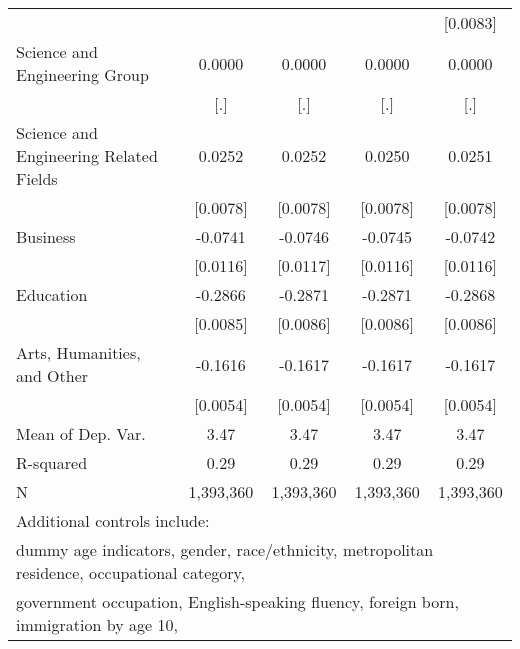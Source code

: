\begin{table}[htbp]
\begin{tabular}{l*{4}{c}}
                    &                     &                     &                     &    [0.0083]         \\
\addlinespace
Science and Engineering Group&      0.0000         &      0.0000         &      0.0000         &      0.0000         \\
                    &         [.]         &         [.]         &         [.]         &         [.]         \\
\addlinespace
Science and Engineering Related Fields&      0.0252\sym{***}&      0.0252\sym{***}&      0.0250\sym{***}&      0.0251\sym{***}\\
                    &    [0.0078]         &    [0.0078]         &    [0.0078]         &    [0.0078]         \\
\addlinespace
Business            &     -0.0741\sym{***}&     -0.0746\sym{***}&     -0.0745\sym{***}&     -0.0742\sym{***}\\
                    &    [0.0116]         &    [0.0117]         &    [0.0116]         &    [0.0116]         \\
\addlinespace
Education           &     -0.2866\sym{***}&     -0.2871\sym{***}&     -0.2871\sym{***}&     -0.2868\sym{***}\\
                    &    [0.0085]         &    [0.0086]         &    [0.0086]         &    [0.0086]         \\
\addlinespace
Arts, Humanities, and Other&     -0.1616\sym{***}&     -0.1617\sym{***}&     -0.1617\sym{***}&     -0.1617\sym{***}\\
                    &    [0.0054]         &    [0.0054]         &    [0.0054]         &    [0.0054]         \\
\midrule
Mean of Dep. Var.   &        3.47         &        3.47         &        3.47         &        3.47         \\
R-squared           &        0.29         &        0.29         &        0.29         &        0.29         \\
N                   &   1,393,360         &   1,393,360         &   1,393,360         &   1,393,360         \\
\bottomrule
\multicolumn{5}{l}{\footnotesize Additional controls include:}\\
\multicolumn{5}{l}{\footnotesize dummy age indicators, gender, race/ethnicity, metropolitan residence, occupational category,}\\
\multicolumn{5}{l}{\footnotesize government occupation, English-speaking fluency, foreign born, immigration by age 10,}\\

\end{tabular}
\end{table}
